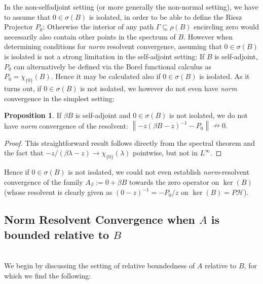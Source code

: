 \documentclass[reqno,12pt,letterpaper]{amsart}
\numberwithin{equation}{section}
\newcommand{\1}{\mathds{1}}
\theoremstyle{definition}
\newtheorem{prop}{Proposition}[section]
\begin{document}
In the non-selfadjoint setting (or more generally the non-normal setting), we have to assume that $0 \in \sigma(B)$ is isolated, in order to be able to define the Riesz Projector $P_0$: Otherwise the interior of any path $\Gamma \subseteq \rho(B)$ encircling zero
 would necessarily also contain other points in the spectrum of $B$.
 However when determining conditions for \emph{norm} resolvent convergence, assuming that $0 \in \sigma(B)$ is isolated is not a strong limitation in the self-adjoint setting: If $B$ is self-adjoint,  $P_0$ can alternatively  be defined via the Borel functional calculus as $P_0 = \chi_{\{0\}}(B)$. Hence it may be calculated also if $0\in \sigma(B)$ is isolated. As it turns out, if $0 \in \sigma(B)$ is not isolated, we however do not even have \emph{norm} convergence in the simplest setting:
 \begin{prop}
 	If $\beta B$ is self-adjoint and $0 \in \sigma(B)$ is not isolated, we do not have  \emph{norm} convergence of the resolvent:
$
 		\left\|-z(\beta B - z)^{-1} - P_0 \right\| \nrightarrow 0.
$
 \end{prop}
 \begin{proof}
 	This straightforward result follows directly from the spectral theorem and the fact that $-z/(\beta\lambda -z) \rightarrow \chi_{\{0\}}(\lambda)$ pointwise, but not in $L^\infty$.
 \end{proof}
Hence if $0\in \sigma(B)$ is not isolated,  we could not even establish \emph{norm}-resolvent convergence of the family  $A_\beta := 0+ \beta B$ towards the zero operator on $\ker(B)$ (whose resolvent is clearly given as $(0 - z)^{-1} = -P_0/z$ on $\ker(B) = P \mathcal{H}$).





	\subsection{Norm Resolvent Convergence when $A$ is bounded  relative to $B$}\label{nrc}\ \\
	

We begin by discussing the setting of relative boundedness of $A$ relative to $B$, for which we find the following:
	
\end{document}
